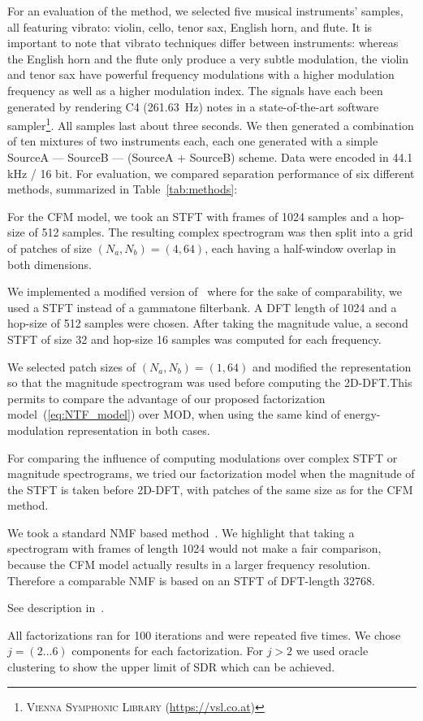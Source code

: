 {{For an evaluation of the method, we selected five musical instruments' samples, all featuring vibrato: violin, cello, tenor sax, English horn, and flute. It is important to note that vibrato techniques differ between instruments: whereas the English horn and the flute only produce a very subtle modulation, the violin and tenor sax have powerful frequency modulations with a higher modulation frequency as well as a higher modulation index. The signals have each been generated by rendering C4 (261.63~Hz) notes in a state-of-the-art software sampler\footnote{\textsc{Vienna Symphonic Library} (\url{https://vsl.co.at})}. All samples last about three seconds. We then generated a combination of ten mixtures of two instruments each, each one generated with a simple SourceA --- SourceB --- (SourceA + SourceB) scheme. Data were encoded in 44.1 kHz / 16 bit.
For evaluation, we compared separation performance of six different methods, summarized in Table~\ref{tab:methods}:
\begin{description}[style=unboxed,leftmargin=0cm]
\item[CFM] For the CFM model, we took an STFT with frames of 1024 samples and a hop-size of 512 samples. The resulting complex spectrogram was then split into a grid of patches of size $(N_a, N_b) = (4, 64)$, each having a half-window overlap in both dimensions.
\item[MOD] We implemented a modified version of~\cite{barker13} where for the sake of comparability, we used a STFT instead of a gammatone filterbank. A DFT length of 1024 and a hop-size of 512 samples were chosen. After taking the magnitude value, a second STFT of size 32 and hop-size 16 samples was computed for each frequency.
\item[CFMMOD] We selected patch sizes of $(N_a, N_b) = (1, 64)$ and modified the representation so that the magnitude spectrogram was used before computing the 2D-DFT.\@ This permits to compare the advantage of our proposed factorization model~(\ref{eq:NTF_model}) over MOD, when using the same kind of energy-modulation representation in both cases.
\item[CFMM] For comparing the influence of computing modulations over complex STFT or magnitude spectrograms, we tried our factorization model when the magnitude of the STFT is taken before 2D-DFT, with patches of the same size as for the CFM method.
\item[NMF] We took a standard NMF based method~\cite{virtanen07}. We highlight that taking a spectrogram with frames of length 1024 would not make a fair comparison, because the CFM model actually results in a larger frequency resolution. Therefore a comparable NMF is based on an STFT of DFT-length 32768.
\item[HR-NMF] See description in~\cite{magron15a}.
\end{description}
All factorizations ran for 100 iterations and were repeated five times. We chose $j=(2\ldots6)$ components for each factorization. For $j > 2$ we used oracle clustering to show the upper limit of SDR which can be achieved.

}}
